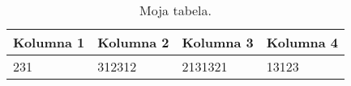 \begin{table}[htbp]
\centering
\begin{tabular}{|l|l|l|l|}
\hline
Kolumna 1 & Kolumna 2 & Kolumna 3 & Kolumna 4 \\ \hline
231       & 312312    & 2131321   & 13123     \\ \hline
\end{tabular}
\label{tab:mikołaj_tabela}
\caption{Moja tabela.}
\end{table}